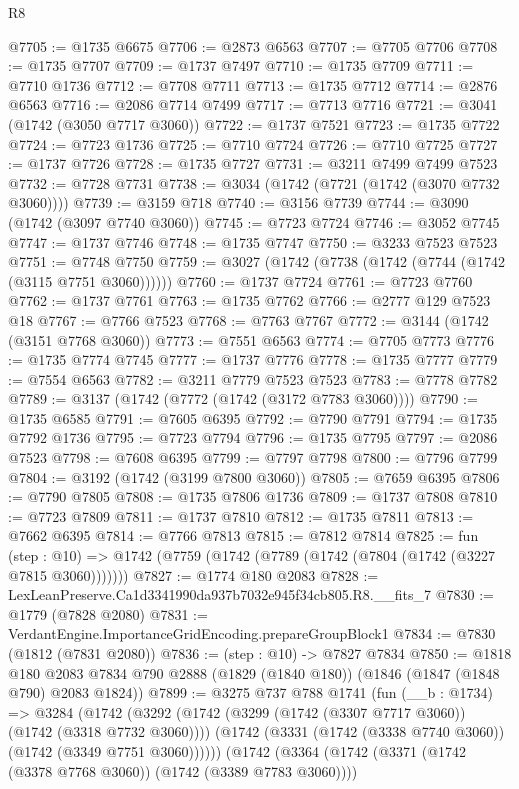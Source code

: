 \begin{lexlean}{R8}
\begin{coremodule}
@7705 := @1735 @6675
@7706 := @2873 @6563
@7707 := @7705 @7706
@7708 := @1735 @7707
@7709 := @1737 @7497
@7710 := @1735 @7709
@7711 := @7710 @1736
@7712 := @7708 @7711
@7713 := @1735 @7712
@7714 := @2876 @6563
@7716 := @2086 @7714 @7499
@7717 := @7713 @7716
@7721 := @3041 (@1742 (@3050 @7717 @3060))
@7722 := @1737 @7521
@7723 := @1735 @7722
@7724 := @7723 @1736
@7725 := @7710 @7724
@7726 := @7710 @7725
@7727 := @1737 @7726
@7728 := @1735 @7727
@7731 := @3211 @7499 @7499 @7523
@7732 := @7728 @7731
@7738 := @3034 (@1742 (@7721 (@1742 (@3070 @7732 @3060))))
@7739 := @3159 @718
@7740 := @3156 @7739
@7744 := @3090 (@1742 (@3097 @7740 @3060))
@7745 := @7723 @7724
@7746 := @3052 @7745
@7747 := @1737 @7746
@7748 := @1735 @7747
@7750 := @3233 @7523 @7523
@7751 := @7748 @7750
@7759 := @3027 (@1742 (@7738 (@1742 (@7744 (@1742 (@3115 @7751 @3060))))))
@7760 := @1737 @7724
@7761 := @7723 @7760
@7762 := @1737 @7761
@7763 := @1735 @7762
@7766 := @2777 @129 @7523 @18
@7767 := @7766 @7523
@7768 := @7763 @7767
@7772 := @3144 (@1742 (@3151 @7768 @3060))
@7773 := @7551 @6563
@7774 := @7705 @7773
@7776 := @1735 @7774 @7745
@7777 := @1737 @7776
@7778 := @1735 @7777
@7779 := @7554 @6563
@7782 := @3211 @7779 @7523 @7523
@7783 := @7778 @7782
@7789 := @3137 (@1742 (@7772 (@1742 (@3172 @7783 @3060))))
@7790 := @1735 @6585
@7791 := @7605 @6395
@7792 := @7790 @7791
@7794 := @1735 @7792 @1736
@7795 := @7723 @7794
@7796 := @1735 @7795
@7797 := @2086 @7523
@7798 := @7608 @6395
@7799 := @7797 @7798
@7800 := @7796 @7799
@7804 := @3192 (@1742 (@3199 @7800 @3060))
@7805 := @7659 @6395
@7806 := @7790 @7805
@7808 := @1735 @7806 @1736
@7809 := @1737 @7808
@7810 := @7723 @7809
@7811 := @1737 @7810
@7812 := @1735 @7811
@7813 := @7662 @6395
@7814 := @7766 @7813
@7815 := @7812 @7814
@7825 := fun (step : @10) =>
  @1742 (@7759 (@1742 (@7789 (@1742 (@7804 (@1742 (@3227 @7815 @3060)))))))
@7827 := @1774 @180 @2083
@7828 := LexLeanPreserve.Ca1d3341990da937b7032e945f34cb805.R8.__fits_7
@7830 := @1779 (@7828 @2080)
@7831 := VerdantEngine.ImportanceGridEncoding.prepareGroupBlock1
@7834 := @7830 (@1812 (@7831 @2080))
@7836 := (step : @10) -> @7827 @7834
@7850 := @1818
    @180
    @2083
    @7834
    @790
    @2888
    (@1829 (@1840 @180))
    (@1846 (@1847 (@1848 @790) @2083 @1824))
@7899 := @3275
    @737
    @788
    @1741
    (fun (__b : @1734) =>
    @3284
      (@1742
        (@3292
          (@1742 (@3299 (@1742 (@3307 @7717 @3060)) (@1742 (@3318 @7732 @3060))))
          (@1742 (@3331 (@1742 (@3338 @7740 @3060)) (@1742 (@3349 @7751 @3060))))))
      (@1742
        (@3364
          (@1742 (@3371 (@1742 (@3378 @7768 @3060)) (@1742 (@3389 @7783 @3060))))

\end{coremodule}
\end{lexlean}
